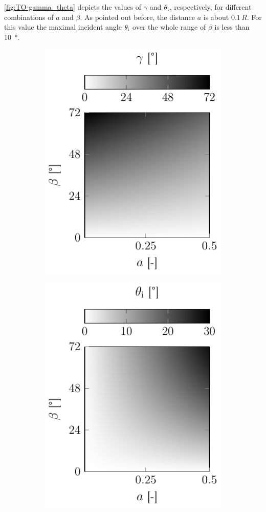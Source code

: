 \cref{fig:TO-gamma_theta} depicts the values of $\gamma$ and $\theta_{\mathrm{i}}$, 
respectively, for different combinations of $a$ and $\beta$. As pointed out 
before, the distance $a$ is about $0.1\,R$. For this value the maximal incident 
angle $\theta_{\mathrm{i}}$ over the whole range of $\beta$ is less than 
\SI{10}{\degree}.

\begin{figure}
  \centering
  \begin{subfigure}[b]{0.45\textwidth}
    \centering
    \includegraphics[]{Plots/cache/gamma.pdf}
    \caption{}
    \label{fig:TO-gamma}
  \end{subfigure}
  \hfill
  \begin{subfigure}[b]{0.45\textwidth}
    \centering
    \includegraphics[]{Plots/cache/theta_i.pdf}

\end{subfigure}
\end{figure}
